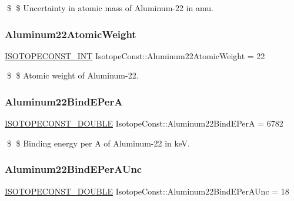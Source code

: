 \$ \$ Uncertainty in atomic mass of Aluminum-\/22 in amu. \mbox{\label{group___isotope_const-_aluminum-_al22_ga45990ecc27176f6de6e78e3a11f39eed}} 
\subsubsection{\texorpdfstring{Aluminum22\+Atomic\+Weight}{Aluminum22AtomicWeight}}
{\footnotesize\ttfamily \mbox{\hyperlink{group___isotope_const-_macros_ga5f18360b3e99483a35c32d789e62621c}{I\+S\+O\+T\+O\+P\+E\+C\+O\+N\+S\+T\+\_\+\+I\+NT}} Isotope\+Const\+::\+Aluminum22\+Atomic\+Weight = 22}

\$ \$ Atomic weight of Aluminum-\/22. \mbox{\label{group___isotope_const-_aluminum-_al22_gad07c7421f7cc9d7790744e65626b5ba5}} 
\subsubsection{\texorpdfstring{Aluminum22\+Bind\+E\+PerA}{Aluminum22BindEPerA}}
{\footnotesize\ttfamily \mbox{\hyperlink{group___isotope_const-_macros_ga8f45a7272ce02c0b4c65c44636ed719a}{I\+S\+O\+T\+O\+P\+E\+C\+O\+N\+S\+T\+\_\+\+D\+O\+U\+B\+LE}} Isotope\+Const\+::\+Aluminum22\+Bind\+E\+PerA = 6782}

\$ \$ Binding energy per A of Aluminum-\/22 in keV. \mbox{\label{group___isotope_const-_aluminum-_al22_ga2ac07ccdd21a9f12e8459ce1a4cbb854}} 
\subsubsection{\texorpdfstring{Aluminum22\+Bind\+E\+Per\+A\+Unc}{Aluminum22BindEPerAUnc}}
{\footnotesize\ttfamily \mbox{\hyperlink{group___isotope_const-_macros_ga8f45a7272ce02c0b4c65c44636ed719a}{I\+S\+O\+T\+O\+P\+E\+C\+O\+N\+S\+T\+\_\+\+D\+O\+U\+B\+LE}} Isotope\+Const\+::\+Aluminum22\+Bind\+E\+Per\+A\+Unc = 18}


